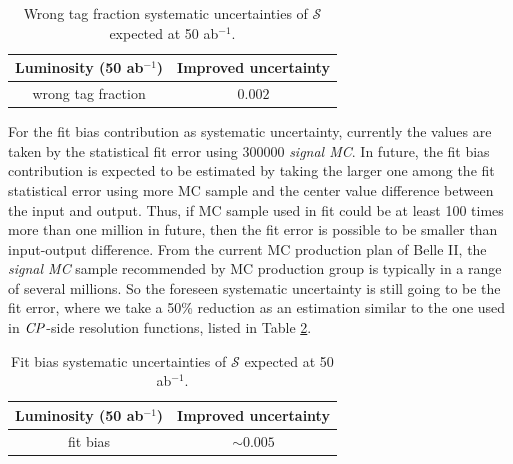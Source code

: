\begin{table}[htpb]
	\centering
	\caption{ Wrong tag fraction systematic uncertainties of $\mathcal{S}$ expected at 50 ab$^{-1}$.}
	\label{tab:wtag_50ab}
	\begin{tabular}{c| c}
		\hline
		Luminosity (50 ab$^{-1}$) & Improved uncertainty \\
		\hline
		wrong tag fraction &  $0.002$\\
		\hline
	\end{tabular}
\end{table}

For the fit bias contribution as systematic uncertainty, currently the values are taken by the statistical fit error using 300000 \textit{signal MC}. In future, the fit bias contribution is expected to be estimated by taking the larger one among the fit statistical error using more MC sample and the center value difference between the input and output. Thus, if MC sample used in fit could be at least 100 times more than one million in future, then the fit error is possible to be smaller than input-output difference. From the current MC production plan of Belle II, the  \textit{signal MC} sample recommended by MC production group is typically in a range of several millions. So the foreseen systematic uncertainty is still going to be the fit error, where we take a 50\% reduction as an estimation similar to the one used in $\it{CP}$-side resolution functions, listed in Table \ref{tab:fitbias_full}.

\begin{table}[htpb]
	\centering
	\caption{ Fit bias systematic uncertainties of $\mathcal{S}$ expected at 50 ab$^{-1}$.}
	\label{tab:fitbias_full}
	\begin{tabular}{c| c}
		\hline
		Luminosity (50 ab$^{-1}$) & Improved uncertainty \\
		\hline
		fit bias &  $\sim 0.005$ \\
		\hline
	\end{tabular}
\end{table}

